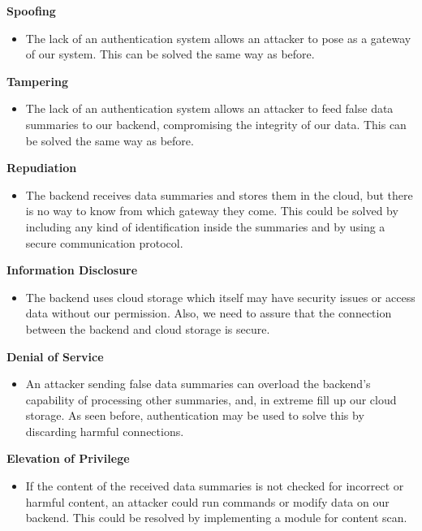\textbf{Spoofing}

\begin{itemize}
    \item The lack of an authentication system allows an attacker to pose as a gateway of our system. This can be solved the same way as before.
\end{itemize}

\textbf{Tampering}

\begin{itemize}
    \item The lack of an authentication system allows an attacker to feed false data summaries to our backend, compromising the integrity of our data. This can be solved the same way as before.
\end{itemize}

\textbf{Repudiation}
\begin{itemize}
    \item The backend receives data summaries and stores them in the cloud, but there is no way to know from which gateway they come. This could be solved by including any kind of identification inside the summaries and by using a secure communication protocol.
\end{itemize}

\textbf{Information Disclosure}
\begin{itemize}
    \item The backend uses cloud storage which itself may have security issues or access data without our permission. Also, we need to assure that the connection between the backend and cloud storage is secure.
\end{itemize}

\textbf{Denial of Service}

\begin{itemize}
    \item An attacker sending false data summaries can overload the backend's capability of processing other summaries, and, in extreme fill up our cloud storage. As seen before, authentication may be used to solve this by discarding harmful connections.
\end{itemize}

\textbf{Elevation of Privilege}

\begin{itemize}
    \item If the content of the received data summaries is not checked for incorrect or harmful content, an attacker could run commands or modify data on our backend. This could be resolved by implementing a module for content scan.
\end{itemize}

